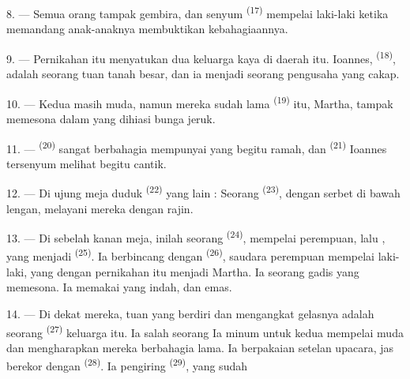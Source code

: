 \VUsaut{3.0mm}

8. --- Semua orang tampak gembira, dan senyum 
\textsuperscript{(17)} mempelai laki-laki ketika memandang anak-anaknya
membuktikan kebahagiaannya.

9. --- Pernikahan itu menyatukan dua keluarga kaya di daerah itu.
Ioannes,  \textsuperscript{(18)}, adalah
 seorang tuan tanah besar, dan ia menjadi
 seorang pengusaha yang cakap.

10. --- Kedua  masih muda, namun mereka sudah lama
  \textsuperscript{(19)}
itu, Martha, tampak memesona dalam  yang dihiasi
bunga jeruk.

11. ---  \textsuperscript{(20)} sangat berbahagia
mempunyai  yang begitu ramah, dan  \textsuperscript{(21)} Ioannes tersenyum melihat  begitu cantik.

12. --- Di ujung meja duduk  \textsuperscript{(22)}
yang lain :  Seorang  \textsuperscript{(23)},
dengan serbet di bawah lengan, melayani mereka dengan rajin.

\VUsaut{3.0mm}

13. --- Di sebelah kanan meja, inilah seorang 
\textsuperscript{(24)},  mempelai perempuan, lalu
, yang menjadi  \textsuperscript{(25)}. Ia berbincang dengan
 \textsuperscript{(26)},
saudara perempuan mempelai laki-laki, yang dengan pernikahan itu
menjadi  Martha. Ia seorang gadis yang
memesona. Ia memakai  yang indah,  dan  emas.

14. --- Di dekat mereka, tuan yang berdiri dan mengangkat gelasnya
adalah seorang  \textsuperscript{(27)} keluarga itu. Ia
salah seorang  Ia
 minum untuk  kedua mempelai muda
dan mengharapkan mereka berbahagia lama. Ia berpakaian setelan
upacara, jas berekor dengan 
\textsuperscript{(28)}. Ia pengiring 
\textsuperscript{(29)}, yang sudah 

